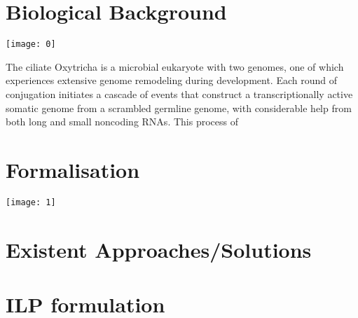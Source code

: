 \section{Biological Background}
\centering
\texttt{[image: 0]}

The ciliate Oxytricha is a microbial eukaryote with two genomes, one of which experiences
extensive genome remodeling during development. Each round of conjugation initiates a cascade
of events that construct a transcriptionally active somatic genome from a scrambled germline
genome, with considerable help from both long and small noncoding RNAs. This process of


\section{Formalisation}
\texttt{[image: 1]}

\section{Existent Approaches/Solutions}

\section{ILP formulation}